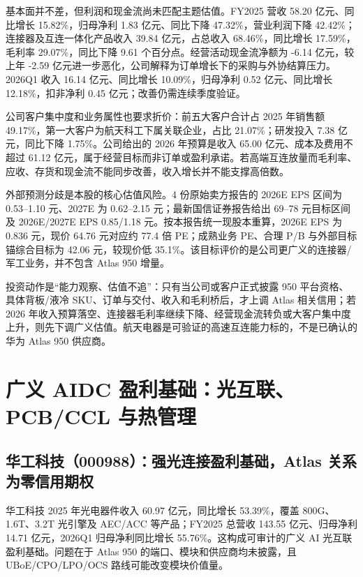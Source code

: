 基本面并不差，但利润和现金流尚未匹配主题估值。FY2025 营收 58.20 亿元、同比增长 15.82\%，归母净利 1.83 亿元、同比下降 47.32\%，营业利润下降 42.42\%；连接器及互连一体化产品收入 39.84 亿元，占总收入 68.46\%，同比增长 17.59\%，毛利率 29.07\%，同比下降 9.61 个百分点。经营活动现金流净额为 -6.14 亿元，较上年 -2.59 亿元进一步恶化，公司解释为订单增长下的采购与外协结算压力。2026Q1 收入 16.14 亿元、同比增长 10.09\%，归母净利 0.52 亿元、同比增长 12.18\%，扣非净利 0.45 亿元；改善仍需连续季度验证。

公司客户集中度和业务属性也要求折价：前五大客户合计占 2025 年销售额 49.17\%，第一大客户为航天科工下属关联企业，占比 21.07\%；研发投入 7.38 亿元，同比下降 1.75\%。公司给出的 2026 年预算是收入 65.00 亿元、成本及费用不超过 61.12 亿元，属于经营目标而非订单或盈利承诺。若高端互连放量而毛利率、应收、存货和现金流不能同步改善，收入增长并不能支撑高倍数。

外部预测分歧是本股的核心估值风险。4 份原始卖方报告的 2026E EPS 区间为 0.53--1.10 元、2027E 为 0.62--2.15 元；最新国信证券报告给出 69--78 元目标区间及 2026E/2027E EPS 0.85/1.18 元。按本报告统一现股本重算，2026E EPS 为 0.836 元，现价 64.76 元对应约 77.4 倍 PE；成熟业务 PE、合理 P/B 与外部目标锚综合目标为 42.06 元，较现价低 35.1\%。该目标评价的是公司更广义的连接器/军工业务，并不包含 Atlas 950 增量。

投资动作是“能力观察、估值不追”：只有当公司或客户正式披露 950 平台资格、具体背板/液冷 SKU、订单与交付、收入和毛利桥后，才上调 Atlas 相关信用；若 2026 年收入预算落空、连接器毛利率继续下降、经营现金流转负或大客户集中度上升，则先下调广义估值。航天电器是可验证的高速互连能力标的，不是已确认的华为 Atlas 950 供应商。

\section{广义 AIDC 盈利基础：光互联、PCB/CCL 与热管理}

\subsection{华工科技（000988）：强光连接盈利基础，Atlas 关系为零信用期权}

华工科技 2025 年光电器件收入 60.97 亿元，同比增长 53.39\%，覆盖 800G、1.6T、3.2T 光引擎及 AEC/ACC 等产品；FY2025 总营收 143.55 亿元、归母净利 14.71 亿元，2026Q1 归母净利同比增长 55.76\%。这构成可审计的广义 AI 光互联盈利基础。问题在于 Atlas 950 的端口、模块和供应商均未披露，且 UBoE/\allowbreak CPO/\allowbreak LPO/\allowbreak OCS 路线可能改变模块价值量。

